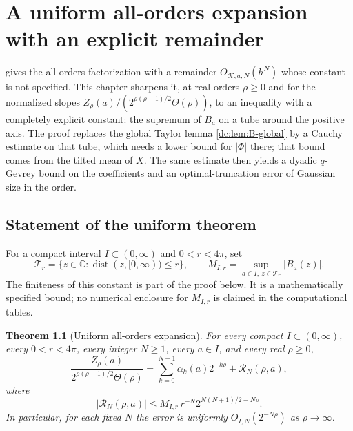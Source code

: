 \documentclass[11pt,a4paper,oneside,openany]{book}
\numberwithin{equation}{chapter}
\newtheorem{theorem}{Theorem}[chapter]
\theoremstyle{definition}
\theoremstyle{remark}
\newcommand{\C}{\mathbb C}
\DeclareMathOperator{\dist}{dist}
\begin{document}

\chapter{A uniform all-orders expansion with an explicit remainder}
\label{ra:sec:asymptotics}
 gives the all-orders factorization with a remainder
$O_{\mathcal K,a,N}(h^N)$ whose constant is not specified. This chapter
sharpens it, at real orders $\rho\ge0$ and for the normalized slopes
$Z_\rho(a)/(2^{\rho(\rho-1)/2}\Theta(\rho))$, to an inequality with a
completely explicit constant: the supremum of $B_a$ on a tube around the
positive axis. The proof replaces the global Taylor lemma
\cref{dc:lem:B-global} by a Cauchy estimate on that tube, which needs a lower
bound for $|\Phi|$ there; that bound comes from the tilted mean of $X$. The
same estimate then yields a dyadic $q$-Gevrey bound on the coefficients and
an optimal-truncation error of Gaussian size in the order.


\section{Statement of the uniform theorem}
For a compact interval $I\subset(0,\infty)$ and $0<r<4\pi$, set
\begin{equation}\label{ra:eq:tube}
 \mathcal T_r=\{z\in\C:\dist(z,[0,\infty))\le r\},\qquad
 M_{I,r}=\sup_{a\in I,\ z\in\mathcal T_r}|B_a(z)|.
\end{equation}
The finiteness of this constant is part of the proof below.
It is a mathematically specified bound; no numerical enclosure for
$M_{I,r}$ is claimed in the computational tables.

\begin{theorem}[Uniform all-orders expansion]\label{ra:thm:asymptotics}
For every compact $I\subset(0,\infty)$, every $0<r<4\pi$, every integer
$N\ge1$, every $a\in I$, and every real $\rho\ge0$,
\begin{equation}\label{ra:eq:maintheorem}
 \frac{Z_\rho(a)}{2^{\rho(\rho-1)/2}\Theta(\rho)}
   =\sum_{k=0}^{N-1}\alpha_k(a)2^{-k\rho}+\mathcal R_N(\rho,a),
\end{equation}
where
\begin{equation}\label{ra:eq:mainremainder}
 |\mathcal R_N(\rho,a)|
 \le M_{I,r}\,r^{-N}2^{N(N+1)/2-N\rho}.
\end{equation}
In particular, for each fixed $N$ the error is uniformly
$O_{I,N}(2^{-N\rho})$ as $\rho\to\infty$.
\end{theorem}
\end{document}
